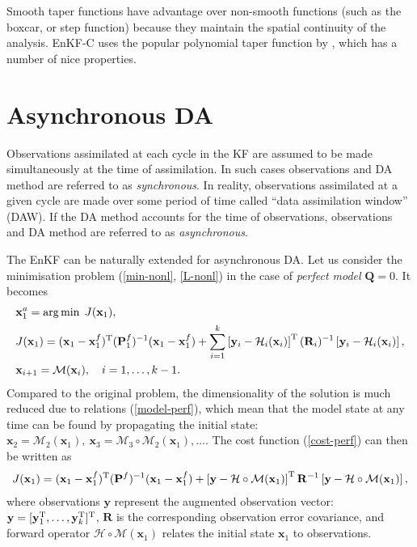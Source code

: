 \documentclass[11pt]{report}
\newcommand{\mb} {\mathbf}
\newcommand{\T}{^{\tiny \mathrm T}}
\begin{document}
Smooth taper functions have advantage over non-smooth functions (such as the boxcar, or step function) because they maintain the spatial continuity of the analysis.
EnKF-C uses the popular polynomial taper function by \citet{gas99a}, which has a number of nice properties.

\section{Asynchronous DA}

Observations assimilated at each cycle in the KF are assumed to be made simultaneously at the time of assimilation.
In such cases observations and DA method are referred to as \emph{synchronous}.
In reality, observations assimilated at a given cycle are made over some period of time called ``data assimilation window'' (DAW).
If the DA method accounts for the time of observations, observations and DA method are referred to as \emph{asynchronous}.

The EnKF can be naturally extended for asynchronous DA.
Let us consider the minimisation problem (\ref{min-nonl}, \ref{L-nonl}) in the case of \emph{perfect model} $\mb Q = 0$.
It becomes
\begin{align}
  \label{min-perf}
  &{\mb x_1^a} = \arg \min \; J(\mb x_1),\\
  \label{cost-perf}
  &J(\mb x_1)  = (\mb x_1 - \mb x_1^f)\T (\mb P_1^f)^{-1} (\mb x_1 - \mb x_1^f) + \sum_{i = 1}^k \left [ \mb y_i - \mathcal H_i(\mb x_i) \right ] \T (\mb R_i)^{-1} \left [ \mb y_i - \mathcal H_i(\mb x_i) \right ],\\
  \label{model-perf}
  &\mb x_{i+1} = \mathcal M(\mb x_i),\quad i = 1,\dots,k-1.
\end{align}
Compared to the original problem, the dimensionality of the solution is much reduced due to relations (\ref{model-perf}), which mean that the model state at any time can be found by propagating the initial state: $\mb x_2 = \mathcal M_2(\mb x_1),\ \mb x_3 = \mathcal M_3 \circ \mathcal M_2(\mb x_1), \dots$.
The cost function (\ref{cost-perf}) can then be written as
\begin{align}
  \label{cost-async}
  J(\mb x_1)  = (\mb x_1 - \mb x_1^f)\T (\mb P^f)^{-1} (\mb x_1 - \mb x_1^f) + \left [ \mb y - \mathcal H \circ \mathcal M(\mb x_1) \right ] \T \mb R^{-1} \left [ \mb y - \mathcal H\circ \mathcal M(\mb x_1) \right ],
\end{align}
where observations $\mb y$ represent the augmented observation vector: $\mb y = [\mb y_1\T,\dots,\mb y_k\T]\T$, $\mb R$ is the corresponding observation error covariance, and forward operator $\mathcal H \circ \mathcal M (\mb x_1)$ relates the initial state $\mb x_1$ to observations.
\end{document}
